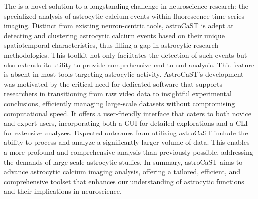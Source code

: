 The  is a novel solution to a longstanding challenge in neuroscience research: the specialized analysis of astrocytic calcium events within fluorescence time-series imaging. Distinct from existing neuron-centric tools, \ac{astroCaST} is adept at detecting and clustering astrocytic calcium events based on their unique spatiotemporal characteristics, thus filling a gap in astrocytic research methodologies. This toolkit not only facilitates the detection of such events but also extends its utility to provide comprehensive end-to-end analysis. This feature is absent in most tools targeting astrocytic activity. AstroCaST's development was motivated by the critical need for dedicated software that supports researchers in transitioning from raw video data to insightful experimental conclusions, efficiently managing large-scale datasets without compromising computational speed. It offers a user-friendly interface that caters to both novice and expert users, incorporating both a \ac{GUI} for detailed explorations and a \ac{CLI} for extensive analyses. Expected outcomes from utilizing \ac{astroCaST} include the ability to process and analyze a significantly larger volume of data. This enables a more profound and comprehensive analysis than previously possible, addressing the demands of large-scale astrocytic studies. In summary, \ac{astroCaST} aims to advance astrocytic calcium imaging analysis, offering a tailored, efficient, and comprehensive toolset that enhances our understanding of astrocytic functions and their implications in neuroscience.